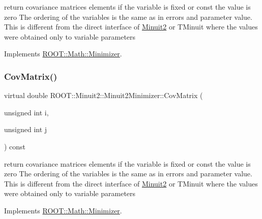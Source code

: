 return covariance matrices elements if the variable is fixed or const the value is zero The ordering of the variables is the same as in errors and parameter value. This is different from the direct interface of \mbox{\hyperlink{namespaceROOT_1_1Minuit2}{Minuit2}} or T\+Minuit where the values were obtained only to variable parameters 

Implements \mbox{\hyperlink{classROOT_1_1Math_1_1Minimizer_a01b0ec371972dab12ca3b9c962d952f8}{R\+O\+O\+T\+::\+Math\+::\+Minimizer}}.

\mbox{\label{classROOT_1_1Minuit2_1_1Minuit2Minimizer_a6ba10de01ab6e7228fa4908894de5619}} 
\subsubsection{\texorpdfstring{CovMatrix()}{CovMatrix()}\hspace{0.1cm}{\footnotesize\ttfamily [3/3]}}
{\footnotesize\ttfamily virtual double R\+O\+O\+T\+::\+Minuit2\+::\+Minuit2\+Minimizer\+::\+Cov\+Matrix (\begin{DoxyParamCaption}\item[{unsigned int}]{i,  }\item[{unsigned int}]{j }\end{DoxyParamCaption}) const\hspace{0.3cm}{\ttfamily [virtual]}}

return covariance matrices elements if the variable is fixed or const the value is zero The ordering of the variables is the same as in errors and parameter value. This is different from the direct interface of \mbox{\hyperlink{namespaceROOT_1_1Minuit2}{Minuit2}} or T\+Minuit where the values were obtained only to variable parameters 

Implements \mbox{\hyperlink{classROOT_1_1Math_1_1Minimizer_a01b0ec371972dab12ca3b9c962d952f8}{R\+O\+O\+T\+::\+Math\+::\+Minimizer}}.

\mbox{\label{classROOT_1_1Minuit2_1_1Minuit2Minimizer_ad9f4873b9651626d2b83cf7eab826b0f}} 
